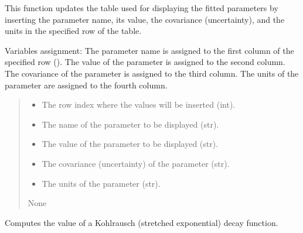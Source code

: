 \documentclass[letterpaper,10pt,english]{sphinxmanual}
\begin{document}
\begin{fulllineitems}
\begin{fulllineitems}
\sphinxAtStartPar
This function updates the table used for displaying the fitted parameters by inserting the parameter name, its 
value, the covariance (uncertainty), and the units in the specified row of the table.

\sphinxAtStartPar
Variables assignment:
\sphinxhyphen{} The parameter name is assigned to the first column of the specified row ().
\sphinxhyphen{} The value of the parameter is assigned to the second column.
\sphinxhyphen{} The covariance of the parameter is assigned to the third column.
\sphinxhyphen{} The units of the parameter are assigned to the fourth column.
\begin{quote}\begin{description}
\begin{itemize}
\item {} 
\sphinxAtStartPar
{} \textendash{} The row index where the values will be inserted (int).

\item {} 
\sphinxAtStartPar
{} \textendash{} The name of the parameter to be displayed (str).

\item {} 
\sphinxAtStartPar
{} \textendash{} The value of the parameter to be displayed (str).

\item {} 
\sphinxAtStartPar
{} \textendash{} The covariance (uncertainty) of the parameter (str).

\item {} 
\sphinxAtStartPar
{} \textendash{} The units of the parameter (str).

\end{itemize}

\sphinxAtStartPar
None

\end{description}\end{quote}

\end{fulllineitems}


\begin{fulllineitems}
\label{\detokenize{FLIMGraphics:FLIMGraphics.FLIMGraphic.kohl_decay}}
\pysigstartsignatures
{}
\pysigstopsignatures
\sphinxAtStartPar
Computes the value of a Kohlrausch (stretched exponential) decay function.


\end{fulllineitems}
\end{fulllineitems}
\end{document}
